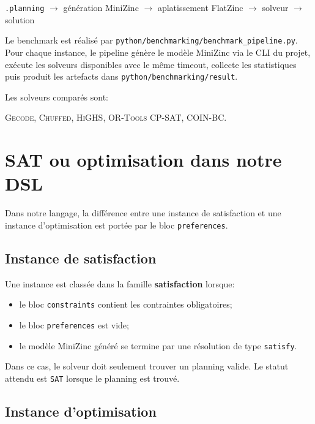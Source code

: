 \documentclass[12pt,a4paper]{article}
\newcommand{\solver}[1]{\textnormal{\textsc{#1}}}
\newcommand{\mzn}{MiniZinc}
\newcommand{\dsl}{\textnormal{\textsc{DSL}}}
\newcommand{\sat}{\texttt{SAT}}
\begin{document}
\begin{center}
\texttt{.planning} $\longrightarrow$ génération \mzn{} $\longrightarrow$ aplatissement FlatZinc $\longrightarrow$ solveur $\longrightarrow$ solution
\end{center}

Le benchmark est réalisé par \texttt{python/benchmarking/benchmark\_pipeline.py}. Pour chaque instance, le pipeline génère le modèle \mzn{} via le CLI du projet, exécute les solveurs disponibles avec le même timeout, collecte les statistiques puis produit les artefacts dans \texttt{python/benchmarking/result}.

Les solveurs comparés sont:

\begin{center}
\solver{Gecode}, \solver{Chuffed}, \solver{HiGHS}, \solver{OR-Tools CP-SAT}, \solver{COIN-BC}.
\end{center}

\section{SAT ou optimisation dans notre \dsl{}}

Dans notre langage, la différence entre une instance de satisfaction et une instance d'optimisation est portée par le bloc \texttt{preferences}.

\subsection{Instance de satisfaction}

Une instance est classée dans la famille \textbf{satisfaction} lorsque:

\begin{itemize}
  \item le bloc \texttt{constraints} contient les contraintes obligatoires;
  \item le bloc \texttt{preferences} est vide;
  \item le modèle \mzn{} généré se termine par une résolution de type \texttt{satisfy}.
\end{itemize}

Dans ce cas, le solveur doit seulement trouver un planning valide. Le statut attendu est \sat{} lorsque le planning est trouvé.

\subsection{Instance d'optimisation}
\end{document}
